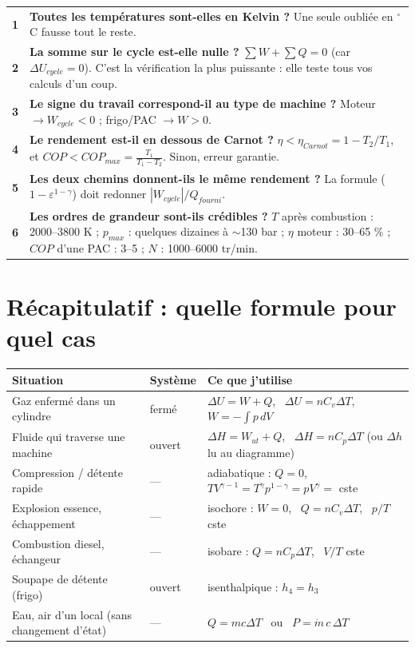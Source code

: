 \documentclass[10.5pt,a4paper]{article}
\newcounter{et}[section]
\begin{document}
\begin{center}
\renewcommand{\arraystretch}{1.7}
\begin{tabularx}{\linewidth}{@{}c X@{}}
\toprule
\textbf{1} & \textbf{Toutes les températures sont-elles en Kelvin ?} Une seule oubliée en $^\circ$C
fausse tout le reste. \\
\textbf{2} & \textbf{La somme sur le cycle est-elle nulle ?} $\sum W+\sum Q=0$ (car $\Delta U_{cycle}=0$).
C'est la vérification la plus puissante : elle teste tous vos calculs d'un coup. \\
\textbf{3} & \textbf{Le signe du travail correspond-il au type de machine ?} Moteur $\rightarrow
W_{cycle}<0$ ; frigo/PAC $\rightarrow W>0$. \\
\textbf{4} & \textbf{Le rendement est-il en dessous de Carnot ?} $\eta<\eta_{Carnot}=1-T_2/T_1$, et
$COP<COP_{max}=\frac{T_1}{T_1-T_2}$. Sinon, erreur garantie. \\
\textbf{5} & \textbf{Les deux chemins donnent-ils le même rendement ?} La formule
($1-\varepsilon^{1-\gamma}$) doit redonner $|W_{cycle}|/Q_{fourni}$. \\
\textbf{6} & \textbf{Les ordres de grandeur sont-ils crédibles ?} $T$ après combustion : 2000--3800 K ;
$p_{max}$ : quelques dizaines à $\sim$130 bar ; $\eta$ moteur : 30--65 \% ; $COP$ d'une PAC : 3--5 ;
$N$ : 1000--6000 tr/min. \\
\bottomrule
\end{tabularx}
\end{center}

\section*{Récapitulatif : quelle formule pour quel cas}

\begin{center}
\renewcommand{\arraystretch}{1.6}
\begin{tabularx}{\linewidth}{@{}l l X@{}}
\toprule
\textbf{Situation} & \textbf{Système} & \textbf{Ce que j'utilise} \\
\midrule
Gaz enfermé dans un cylindre & fermé & $\Delta U=W+Q$, \ $\Delta U=nC_v\Delta T$, \ $W=-\int p\,dV$ \\
Fluide qui traverse une machine & ouvert & $\Delta H=W_{ut}+Q$, \ $\Delta H=nC_p\Delta T$ (ou $\Delta h$
lu au diagramme) \\
Compression / détente rapide & --- & adiabatique : $Q=0$, \ $TV^{\gamma-1}=T^{\gamma}p^{1-\gamma}=pV^{\gamma}=$ cste \\
Explosion essence, échappement & --- & isochore : $W=0$, \ $Q=nC_v\Delta T$, \ $p/T$ cste \\
Combustion diesel, échangeur & --- & isobare : $Q=nC_p\Delta T$, \ $V/T$ cste \\
Soupape de détente (frigo) & ouvert & isenthalpique : $h_4=h_3$ \\
Eau, air d'un local (sans changement d'état) & --- & $Q=mc\Delta T$ \ ou \ $P=\dot m\,c\,\Delta T$ \\
\bottomrule
\end{tabularx}
\end{center}
\end{document}
